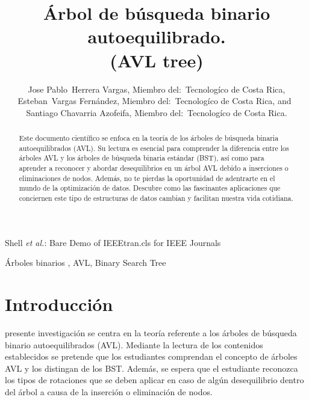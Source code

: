 \documentclass[journal]{IEEEtran}
\begin{document}
\title{Árbol de búsqueda binario autoequilibrado.\\(AVL tree)}



\author
    {Jose Pablo~Herrera Vargas, {Miembro del:~Tecnologíco de Costa Rica,}
        \\Esteban~Vargas Fernández, {Miembro del:~Tecnologíco de Costa Rica,}
        and~ \\Santiago Chavarria Azofeifa, {Miembro del:~Tecnologíco de Costa Rica.}

}

{Shell \MakeLowercase{\textit{et al.}}: Bare Demo of IEEEtran.cls for IEEE Journals}

\maketitle


\begin{abstract}
Este documento científico se enfoca en la teoría de los árboles de búsqueda binaria autoequilibrados (AVL). Su lectura es esencial para comprender la diferencia entre los árboles AVL y los árboles de búsqueda binaria estándar (BST), así como para aprender a reconocer y abordar desequilibrios en un árbol AVL debido a inserciones o eliminaciones de nodos. Además, no te pierdas la oportunidad de adentrarte en el mundo de la optimización de datos. Descubre como las fascinantes aplicaciones que conciernen este tipo de estructuras de datos cambian y facilitan nuestra vida cotidiana.
\end{abstract}


\begin{IEEEkeywords}
 Árboles binarios , AVL, Binary Search Tree
\end{IEEEkeywords}

\IEEEpeerreviewmaketitle



\section{Introducción}

presente investigación se centra en la teoría referente a los árboles de búsqueda binario autoequilibrados (AVL). Mediante la lectura de los contenidos establecidos se pretende que los estudiantes comprendan el concepto de árboles AVL y los distingan de los BST. Además, se espera que el estudiante reconozca los tipos de rotaciones que se deben aplicar en caso de algún desequilibrio dentro del árbol a causa de la inserción o eliminación de nodos.
 \cite{Experiencia en la construcción de Objetos de Aprendizaje}
 
\end{document}

